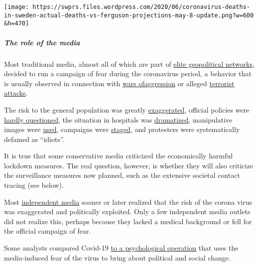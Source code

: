 \texttt{[image: https://swprs.files.wordpress.com/2020/06/coronavirus-deaths-in-sweden-actual-deaths-vs-ferguson-projections-may-8-update.png?w=600\\\&h=470]}

\hypertarget{the-role-of-the-media}{%
\subparagraph{\texorpdfstring{\textbf{The role of the
media}}{The role of the media}}\label{the-role-of-the-media}}

Most traditional media, almost all of which are part of
\href{https://swprs.org/the-american-empire-and-its-media/}{elite
geopolitical networks}, decided to run a campaign of fear during the
coronavirus period, a behavior that is usually observed in connection
with
\href{https://www.infosperber.ch/Artikel/Gesundheit/13-irrefuhrende-und-falsche-Behauptungen-zur-Corona-Epidemie}{wars
of}\href{https://swprs.org/the-syria-deception/}{aggression} or alleged
\href{https://www.motherjones.com/politics/2013/01/terror-factory-fbi-trevor-aaronson-book/}{terrorist
attacks}.

The risk to the general population was greatly
\href{https://www.infosperber.ch/index.cfm\%3Fgo\%3DArtikel/Gesundheit/13-irrefuhrende-und-falsche-Behauptungen-zur-Corona-Epidemie/\%26g\%3Dad}{exaggerated},
official policies were
\href{https://www.zora.uzh.ch/id/eprint/186723/1/jarren_corona.pdf}{hardly
questioned}, the situation in hospitals was
\href{https://www.globalresearch.ca/truth-behind-refrigerated-morgue-truck-stories/5711475}{dramatized},
manipulative images were
\href{https://nypost.com/2020/04/01/cbs-admits-to-using-footage-from-italy-in-report-about-nyc/}{used},
campaigns were
\href{https://www.youtube.com/watch?v=oQWRCECbN-Y}{staged}, and
protesters were systematically defamed as ``idiots''.

It is true that some conservative media criticized the economically
harmful lockdown measures. The real question, however, is whether they
will also criticize the surveillance measures now planned, such as the
extensive societal contact tracing (see below).

Most \href{https://swprs.org/media-navigator/}{independent media} sooner
or later realized that the risk of the corona virus was exaggerated and
politically exploited. Only a few independent media outlets did not
realize this, perhaps because they lacked a medical background or fell
for the official campaign of fear.

Some analysts compared Covid-19
\href{https://digwithin.net/2020/06/03/coronavirus-scare/}{to a
psychological operation} that uses the media-induced fear of the virus
to bring about political and social change.

